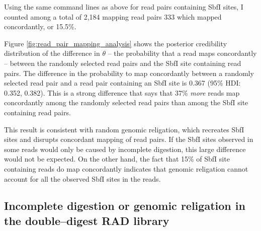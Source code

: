 \documentclass[a4paper,12pt,times,print,index,custombib,custommargin]{PhDThesisPSnPDF}\usepackage[]{graphicx}\usepackage[]{color}
\begin{document}
Using the same command lines as above for read pairs containing SbfI sites, I counted among a total of 2,184 mapping read pairs 333 which mapped concordantly, or 15.5\%. 

Figure \ref{fig:read_pair_mapping_analysis} shows the posterior credibility distribution of the difference in $\theta$ -- the probability that a read maps concordantly -- between the randomly selected read pairs and the SbfI site containing read pairs. The difference in the probability to map concordantly between a randomly selected read pair and a read pair containing an SbfI site is 0.367 (95\% HDI: 0.352, 0.382). This is a strong difference that says that 37\% \emph{more} reads map concordantly among the randomly selected read pairs than among the SbfI site containing read pairs.

This result is consistent with random genomic religation, which recreates SbfI sites and disrupts concordant mapping of read pairs. If the SbfI sites observed in some reads would only be caused by incomplete digestion, this large difference would not be expected. On the other hand, the fact that 15\% of SbfI site containing reads do map concordantly indicates that genomic religation cannot account for all the observed SbfI sites in the reads.


\subsection{Incomplete digestion or genomic religation in the double--digest RAD library}
\end{document}
